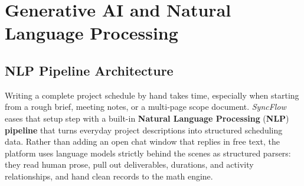 \chapter{Generative AI and Natural Language Processing}
\section{NLP Pipeline Architecture}
Writing a complete project schedule by hand takes time, especially when starting from a rough brief, meeting notes, or a multi-page scope document. \textit{SyncFlow} eases that setup step with a built-in \textbf{Natural Language Processing} (\textbf{NLP}) \textbf{pipeline} that turns everyday project descriptions into structured scheduling data. Rather than adding an open chat window that replies in free text, the platform uses language models strictly behind the scenes as structured parsers: they read human prose, pull out deliverables, durations, and activity relationships, and hand clean records to the math engine.

\vspace{4mm}

